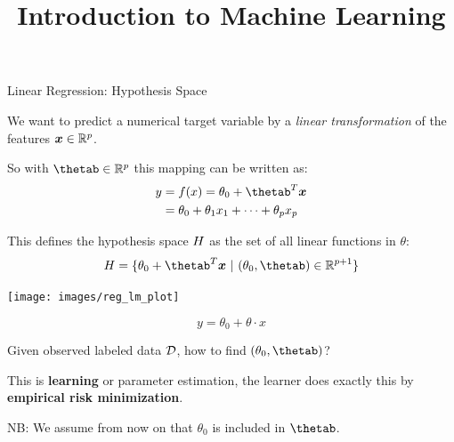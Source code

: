 \documentclass[11pt,compress,t,notes=noshow, xcolor=table]{beamer}
\title{Introduction to Machine Learning}
\institute{\href{https://compstat-lmu.github.io/lecture_i2ml/}{compstat-lmu.github.io/lecture\_i2ml}}
\date{}
\newenvironment{knitrout}{}{} %
\begin{document}


















\begin{vbframe}{Linear Regression: Hypothesis Space}
\lz

We want to predict a numerical target variable by a \emph{linear transformation} of the features $\bm{x} \in \mathbb{R}^p$.

\lz

So with $\thetab \in \mathbb{R}^p$ this mapping can be written as:
\begin{align*}
y &= \fx = \theta_0 + \thetab^T \xv \\
  &= \theta_0 + \theta_1 x_1 + \dots + \theta_p x_p
\end{align*}

\lz

This defines the hypothesis space $H$ as the set of all linear functions in $\theta$:
\[
\Hspace = \{ \theta_0 + \thetab^T \xv\ |\ (\theta_0, \thetab) \in \mathbb{R}^{p+1} \}
\]

\framebreak

\begin{knitrout}\scriptsize
{}\color{fgcolor}

{\centering \texttt{[image: images/reg\_lm\_plot]} 

}



\end{knitrout}

\[
y = \theta_0 + \theta \cdot x
\]

\framebreak

\lz

Given observed labeled data $\mathcal{D}$, how to find $(\theta_0, \thetab)$?\\

\lz

This is \textbf{learning} or parameter estimation, the learner does exactly this by \textbf{empirical risk minimization}.

\lz
\lz

NB: We assume from now on that $\theta_0$ is included in $\thetab$.

\end{vbframe}
\end{document}
